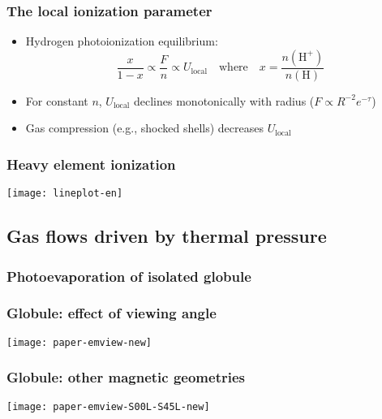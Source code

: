 \documentclass[presentation]{beamer}
\begin{document}
\begin{frame}
  \frametitle{The local ionization parameter}
  \begin{itemize}
  \item Hydrogen photoionization equilibrium:
    \[
      \frac{x}{1-x} \propto \frac{F}{n} \propto U_\mathrm{local}
      \quad \text{where} \quad x = \frac{n(\mathrm{H}^+)}{n(\mathrm{H})}
    \]
  \item For constant \(n\), \(U_\mathrm{local}\) declines monotonically with
    radius (\(F \propto R^{-2} e^{-\tau}\))
  \item Gas compression (e.g., shocked shells) decreases
    \(U_\mathrm{local}\)
  \end{itemize}
\end{frame}

\begin{frame}
  \frametitle{Heavy element ionization}
  \texttt{[image: lineplot-en]}
\end{frame}

\subsection{Gas flows driven by thermal pressure}

\begin{frame}
  \frametitle{Photoevaporation of isolated globule}
\end{frame}

\begin{frame}
  \frametitle{Globule: effect of viewing angle}
  \centering
  \texttt{[image: paper-emview-new]}
\end{frame}


\begin{frame}
  \frametitle{Globule: other magnetic geometries}
  \centering
  \texttt{[image: paper-emview-S00L-S45L-new]}
\end{frame}



\def\MovieFile{greece-figs/Ostar-512-PDR-2014.mov}
\end{document}
